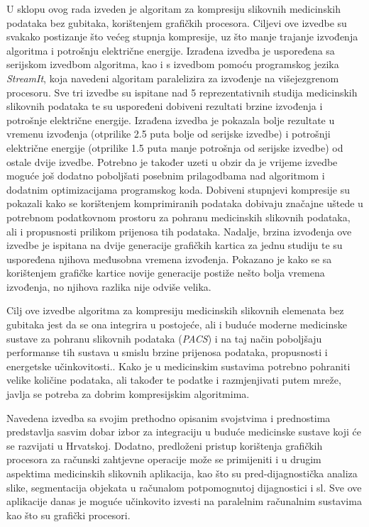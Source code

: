 \documentclass[times, utf8, zavrsni, numeric, sort]{fer}
\begin{document}
U sklopu ovog rada izveden je algoritam za kompresiju  slikovnih medicinskih podataka bez gubitaka, korištenjem grafičkih procesora. Ciljevi ove izvedbe su svakako postizanje što većeg stupnja kompresije, uz što manje trajanje izvođenja algoritma i potrošnju električne energije. Izrađena izvedba je uspoređena sa serijskom izvedbom algoritma, kao i s izvedbom pomoću programskog jezika \emph{StreamIt}, koja navedeni algoritam paralelizira za izvođenje na višejezgrenom procesoru. Sve tri izvedbe su ispitane nad 5 reprezentativnih studija medicinskih slikovnih podataka te su uspoređeni dobiveni rezultati brzine izvođenja i potrošnje električne energije. Izrađena izvedba je pokazala bolje rezultate u vremenu izvođenja (otprilike 2.5 puta bolje od serijske izvedbe) i potrošnji električne energije (otprilike 1.5 puta manje potrošnja od serijske izvedbe) od ostale dvije izvedbe. Potrebno je također uzeti u obzir da je vrijeme izvedbe moguće još dodatno poboljšati  posebnim prilagodbama nad algoritmom i dodatnim optimizacijama programskog koda. Dobiveni stupnjevi kompresije su pokazali kako se korištenjem komprimiranih podataka dobivaju značajne uštede u potrebnom podatkovnom prostoru za pohranu medicinskih slikovnih podataka, ali i propusnosti prilikom prijenosa tih podataka. Nadalje, brzina izvođenja ove izvedbe je ispitana na dvije generacije grafičkih kartica za jednu studiju te su uspoređena njihova međusobna vremena izvođenja. Pokazano je kako se sa korištenjem grafičke kartice novije generacije postiže nešto bolja vremena izvođenja, no njihova razlika nije odviše velika.

Cilj ove izvedbe algoritma za kompresiju medicinskih slikovnih elemenata bez gubitaka jest da se ona integrira u postojeće, ali i buduće moderne medicinske sustave za pohranu slikovnih podataka (\emph{PACS}) i na taj način poboljšaju performanse tih sustava u smislu brzine prijenosa podataka, propusnosti i energetske učinkovitosti.. Kako je u medicinskim sustavima potrebno pohraniti velike količine podataka, ali također te podatke i razmjenjivati putem mreže, javlja se potreba za dobrim kompresijskim algoritmima.

Navedena izvedba sa svojim prethodno opisanim svojstvima i prednostima predstavlja sasvim dobar izbor za integraciju u buduće medicinske sustave koji će se razvijati u Hrvatskoj. Dodatno, predloženi pristup korištenja grafičkih procesora za računski zahtjevne operacije može se primijeniti i u drugim aspektima medicinskih slikovnih aplikacija, kao što su pred-dijagnostička analiza slike, segmentacija objekata u računalom potpomognutoj dijagnostici i sl. Sve ove aplikacije danas je moguće učinkovito izvesti na paralelnim računalnim sustavima kao što su grafički procesori.
\end{document}
